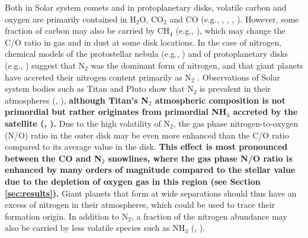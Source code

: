 \documentclass[apj]{emulateapj}
\begin{document}
Both in Solar system comets and in protoplanetary disks, volatile carbon and oxygen are primarily contained in H$_2$O, CO$_2$ and CO (e.g., \citealt{lodders03}, \citealt{mumma11}, \citealt{oberg11}, \citealt{boogert15}). However, some fraction of carbon may also be carried by CH$_4$ (e.g., \citealt{oberg08}), which may change the C/O ratio in gas and in dust at some disk locations. In the case of nitrogen, chemical models of the protostellar nebula (e.g., \citealt{owen01}) and of protoplanetary disks (e.g., \citealt{rodgers02}) suggest that N$_2$ was the dominant form of nitrogen, and that giant planets have accreted their nitrogen content primarily as N$_2$ \citep{mousis14}. Observations of Solar system bodies such as Titan and Pluto show that N$_2$ is prevalent in their atmospheres (\citealt{cruikshank93}, \citealt{owen93}), \textbf{although Titan's N$_2$ atmospheric composition is not primordial but rather originates from primordial NH$_3$ accreted by the satellite (\citealt{atreya78}, \citealt{mandt14}).}  %
Due to the high volatility of N$_2$, the gas phase nitrogen-to-oxygen (N/O) ratio in the outer disk may be even more enhanced than the C/O ratio compared to its average value in the disk. \textbf{This effect is most pronounced between the CO and N$_2$ snowlines, where the gas phase N/O ratio is enhanced by many orders of magnitude compared to the stellar value due to the depletion of oxygen gas in this region (see Section \ref{sec:results}).} Giant planets that form at wide separations should thus have an excess of nitrogen in their atmospheres, which could be used to trace their formation origin. In addition to N$_2$, a fraction of the nitrogen abundance may also be carried by less volatile species such as NH$_3$ (\citealt{bottinelli10}, \citealt{mumma11}). 
\end{document}
